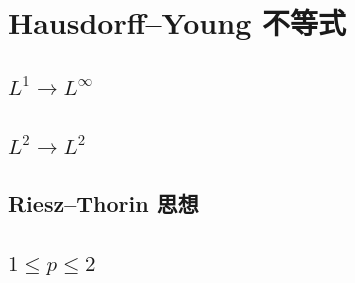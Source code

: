 \section{Hausdorff–Young 不等式}
\label{b2:sec:0402}


\subsection{\texorpdfstring{\(L^1\to L^\infty\)}{L1∞}}
\label{b2:subsec:040201}

\subsection{\texorpdfstring{\(L^2\to L^2\)}{L22}}
\label{b2:subsec:040202}

\subsection{Riesz–Thorin 思想}
\label{b2:subsec:040203}

\subsection{\texorpdfstring{\(1\le p\le2\)}{12}}
\label{b2:subsec:040204}


